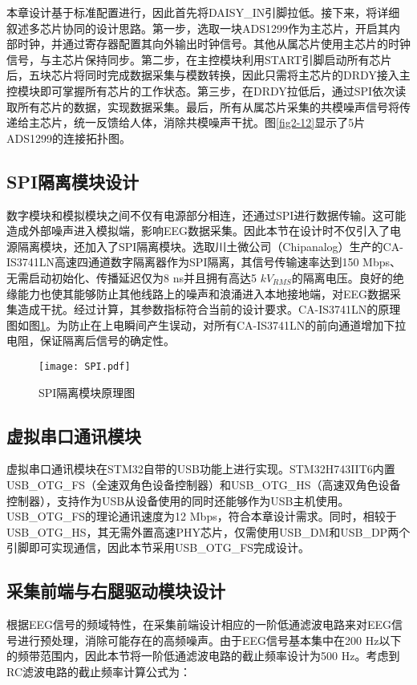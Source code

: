 本章设计基于标准配置进行，因此首先将DAISY\_IN引脚拉低。接下来，将详细叙述多芯片协同的设计思路。第一步，选取一块ADS1299作为主芯片，开启其内部时钟，并通过寄存器配置其向外输出时钟信号。其他从属芯片使用主芯片的时钟信号，与主芯片保持同步。第二步，在主控模块利用START引脚启动所有芯片后，五块芯片将同时完成数据采集与模数转换，因此只需将主芯片的DRDY接入主控模块即可掌握所有芯片的工作状态。第三步，在DRDY拉低后，通过SPI依次读取所有芯片的数据，实现数据采集。最后，所有从属芯片采集的共模噪声信号将传递给主芯片，统一反馈给人体，消除共模噪声干扰。图\ref{fig2-12}显示了5片ADS1299的连接拓扑图。

\subsection{SPI隔离模块设计}

数字模块和模拟模块之间不仅有电源部分相连，还通过SPI进行数据传输。这可能造成外部噪声进入模拟端，影响EEG数据采集。因此本节在设计时不仅引入了电源隔离模块，还加入了SPI隔离模块。选取川土微公司（Chipanalog）生产的CA-IS3741LN高速四通道数字隔离器作为SPI隔离，其信号传输速率达到150 Mbps、无需启动初始化、传播延迟仅为8 ns并且拥有高达5 $kV_{RMS}$的隔离电压。良好的绝缘能力也使其能够防止其他线路上的噪声和浪涌进入本地接地端，对EEG数据采集造成干扰。经过计算，其参数指标符合当前的设计要求。CA-IS3741LN的原理图如图\ref{fig2-13}。为防止在上电瞬间产生误动，对所有CA-IS3741LN的前向通道增加下拉电阻，保证隔离后信号的确定性。
\begin{figure}[!h]
	\centering
	\texttt{[image: SPI.pdf]}
	\caption{SPI隔离模块原理图} 
	\label{fig2-13}
\end{figure}

\subsection{虚拟串口通讯模块}
虚拟串口通讯模块在STM32自带的USB功能上进行实现。STM32H743IIT6内置USB\_OTG\_FS（全速双角色设备控制器）和USB\_OTG\_HS（高速双角色设备控制器），支持作为USB从设备使用的同时还能够作为USB主机使用。USB\_OTG\_FS的理论通讯速度为12 Mbps，符合本章设计需求。同时，相较于USB\_OTG\_HS，其无需外置高速PHY芯片，仅需使用USB\_DM和USB\_DP两个引脚即可实现通信，因此本节采用USB\_OTG\_FS完成设计。

\subsection{采集前端与右腿驱动模块设计}

根据EEG信号的频域特性，在采集前端设计相应的一阶低通滤波电路来对EEG信号进行预处理，消除可能存在的高频噪声。由于EEG信号基本集中在200 Hz以下的频带范围内，因此本节将一阶低通滤波电路的截止频率设计为500 Hz。考虑到RC滤波电路的截止频率计算公式为：

